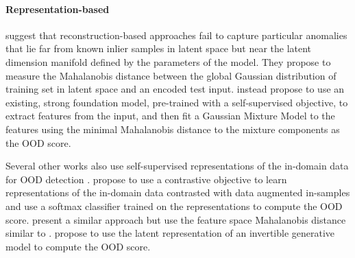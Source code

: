 \paragraph{Representation-based}
%
\textcite{denouden_improving_2018} suggest that reconstruction-based approaches fail to capture particular anomalies that lie far from known inlier samples in latent space but near the latent dimension manifold defined by the parameters of the model. They propose to measure the Mahalanobis distance between the global Gaussian distribution of training set in latent space and an encoded test input. 
\textcite{xiao_we_2021} instead propose to use an existing, strong foundation model, pre-trained with a self-supervised objective, to extract features from the input, and then fit a Gaussian Mixture Model to the features using the minimal Mahalanobis distance to the mixture components as the OOD score.

Several other works also use self-supervised representations of the in-domain data for OOD detection \parencite{hendrycks_using_2019,bergman_classificationbased_2020}. 
\textcite{tack_csi_2020} propose to use a contrastive objective to learn representations of the in-domain data contrasted with data augmented in-samples and use a softmax classifier trained on the representations to compute the OOD score. \textcite{sehwag_ssd_2021} present a similar approach but use the feature space Mahalanobis distance similar to \textcite{denouden_improving_2018}. 
\textcite{ahmadian_likelihoodfree_2021} propose to use the latent representation of an invertible generative model to compute the OOD score.


